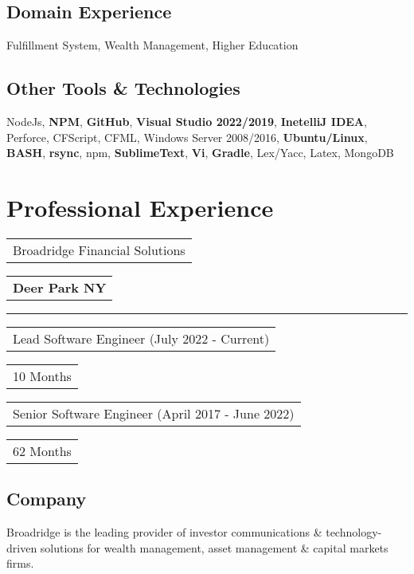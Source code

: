 \documentclass[letterpaper,11pt]{article}
\begin{document}
\subsection{Domain Experience}
Fulfillment System, Wealth Management, Higher Education

\subsection{Other Tools \& Technologies}
NodeJs, \textbf{NPM}, \textbf{GitHub}, \textbf{Visual Studio 2022/2019}, \textbf{InetelliJ IDEA}, Perforce, CFScript, CFML, Windows Server 2008/2016, \textbf{Ubuntu/Linux}, \textbf{BASH}, \textbf{rsync}, npm, \textbf{SublimeText}, \textbf{Vi}, \textbf{Gradle}, Lex/Yacc, Latex, MongoDB

\section{Professional Experience}


    \noindent
    \begin{tabular}[t]{@{}l}
    \Large{Broadridge Financial Solutions}
    \end{tabular}
    \hfill
    \begin{tabular}[t]{l@{}}
    \textbf{Deer Park NY}
    \end{tabular}
    \noindent\rule{\textwidth}{0.5pt}
    \begin{tabular}[t]{@{}l}
    Lead Software Engineer (July 2022 - Current)
    \end{tabular}
    \hfill
    \begin{tabular}[t]{l@{}}
    10 Months
    \end{tabular}
    \begin{tabular}[t]{@{}l}
    Senior Software Engineer (April 2017 - June 2022)
    \end{tabular}
    \hfill
    \begin{tabular}[t]{l@{}}
    62 Months
    \end{tabular}

    \subsection{Company}
    Broadridge is the leading provider of investor communications \& technology-driven solutions for wealth management, asset management \& capital markets firms.
\end{document}
